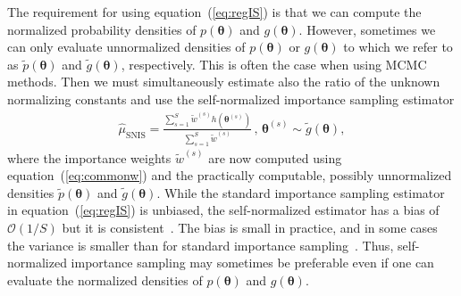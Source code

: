 \documentclass[12pt]{article}
\newenvironment{nalign}{
    \begin{equation}
    \begin{aligned}
}{
    \end{aligned}
    \end{equation}
    \ignorespacesafterend
}
\begin{document}
The requirement for using equation~(\ref{eq:regIS}) is that we can compute the normalized probability densities of
$p (\boldsymbol{\theta} )$ and $g (\boldsymbol{\theta} )$.
However, sometimes 
we can only evaluate unnormalized densities of $p(\boldsymbol{\theta})$ or 
$g(\boldsymbol{\theta})$ to which we refer to as $\widetilde{p}(\boldsymbol{\theta})$
and $\widetilde{g}(\boldsymbol{\theta})$, respectively.
This is often the case when using MCMC methods.
Then we must simultaneously estimate also the ratio of the unknown normalizing
constants and use the self-normalized importance sampling estimator
\begin{nalign} \label{eq:SNIS}
\hat{\mu}_{\text{SNIS}} =  \frac{ \sum_{s = 1}^S \widetilde{w}^{(s)} h (\boldsymbol{\theta}^{(s)})}{\sum_{s = 1}^S \widetilde{w}^{(s)}}  \, , \, \boldsymbol{\theta}^{(s)} \sim \widetilde{g} (\boldsymbol{\theta}) ,
\end{nalign}
where the importance weights $\widetilde{w}^{(s)}$ are now computed
using equation~(\ref{eq:commonw}) and the practically computable, possibly unnormalized densities
$\widetilde{p}(\boldsymbol{\theta})$
and $\widetilde{g}(\boldsymbol{\theta})$.
While the standard importance sampling estimator in equation~(\ref{eq:regIS}) is unbiased, the self-normalized estimator
has a bias of $\mathcal{O} (1/S)$ but it is consistent~\citep{kong1992note}.
%
The bias is small in practice, and in some cases the variance is smaller than for
standard importance sampling~\citep{casella1998post}. Thus, self-normalized
importance sampling may sometimes be preferable even if one can evaluate 
the normalized densities of $p (\boldsymbol{\theta} )$ and $g (\boldsymbol{\theta} )$.
\end{document}
